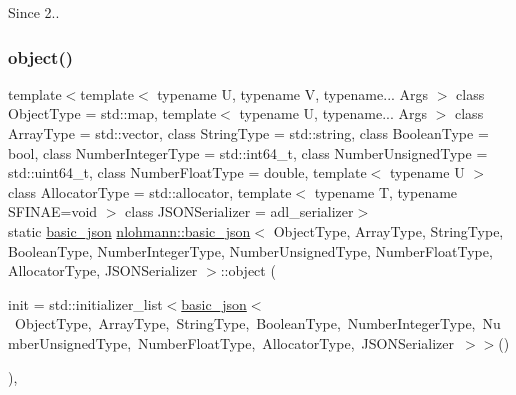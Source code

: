 \begin{DoxySince}{Since}
2.. 
\end{DoxySince}
\mbox{\label{classnlohmann_1_1basic__json_a9f42ee7d10eee2d5a73fd94ca7f767ca}} 
\subsubsection{\texorpdfstring{object()}{object()}}
{\footnotesize\ttfamily template$<$template$<$ typename U, typename V, typename... Args $>$ class Object\+Type = std\+::map, template$<$ typename U, typename... Args $>$ class Array\+Type = std\+::vector, class String\+Type  = std\+::string, class Boolean\+Type  = bool, class Number\+Integer\+Type  = std\+::int64\+\_\+t, class Number\+Unsigned\+Type  = std\+::uint64\+\_\+t, class Number\+Float\+Type  = double, template$<$ typename U $>$ class Allocator\+Type = std\+::allocator, template$<$ typename T, typename S\+F\+I\+N\+A\+E=void $>$ class J\+S\+O\+N\+Serializer = adl\+\_\+serializer$>$ \\
static \mbox{\hyperlink{classnlohmann_1_1basic__json}{basic\+\_\+json}} \mbox{\hyperlink{classnlohmann_1_1basic__json}{nlohmann\+::basic\+\_\+json}}$<$ Object\+Type, Array\+Type, String\+Type, Boolean\+Type, Number\+Integer\+Type, Number\+Unsigned\+Type, Number\+Float\+Type, Allocator\+Type, J\+S\+O\+N\+Serializer $>$\+::object (\begin{DoxyParamCaption}\item[{std\+::initializer\+\_\+list$<$ \mbox{\hyperlink{classnlohmann_1_1basic__json}{basic\+\_\+json}}$<$ Object\+Type, Array\+Type, String\+Type, Boolean\+Type, Number\+Integer\+Type, Number\+Unsigned\+Type, Number\+Float\+Type, Allocator\+Type, J\+S\+O\+N\+Serializer $>$ $>$}]{init = {\ttfamily std\+:\+:initializer\+\_\+list$<$\mbox{\hyperlink{classnlohmann_1_1basic__json}{basic\+\_\+json}}$<$~ObjectType,~ArrayType,~StringType,~BooleanType,~NumberIntegerType,~NumberUnsignedType,~NumberFloatType,~AllocatorType,~JSONSerializer~$>$$>$()} }\end{DoxyParamCaption})\hspace{0.3cm}{\ttfamily [inline]}, {\ttfamily [static]}}



